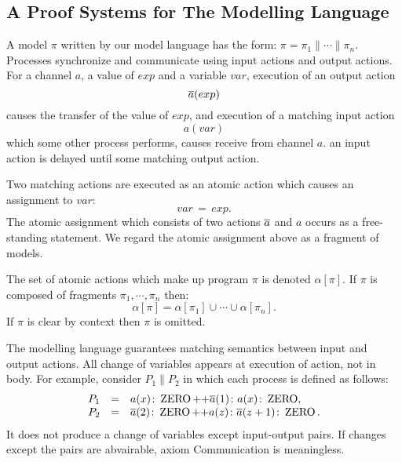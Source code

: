 \documentclass[12pt,a4paper,titlepage]{article}
\theoremstyle{break}
\begin{document}
\subsection{A Proof Systems for The Modelling Language}\label{sec:ProofSystems}
A model \(\pi\) written by our model language has the form: \(\pi=\pi_1\|\cdots\|\pi_n\).
Processes synchronize and communicate using input actions and output actions.
For a channel \(a\), a value of \(exp\) and a variable \(var\), execution of an output action
  \begin{displaymath}
\mbox{$\overline{a}$}(exp)
  \end{displaymath}
causes the transfer of the value of \(exp\), and execution of a matching input action 
  \begin{displaymath}
a(var)
  \end{displaymath}
which some other process performs, causes receive from channel \(a\).
an input action is delayed until some matching output action.

Two matching actions are executed as an atomic action which causes an assignment to \(var\):
  \begin{displaymath}
var\,=\,exp.
  \end{displaymath}
The atomic assignment which consists of two actions \(\mbox{$\overline{a}$}\) and \(a\) occurs as a free-standing statement.
We regard the atomic assignment above as a fragment of models.

The set of atomic actions which make up program \(\pi\) is denoted \(\alpha[\pi]\).
If \(\pi\) is composed of fragments \(\pi_1,\cdots,\pi_n\) then:
  \begin{displaymath}
\alpha[\pi]=\alpha[\pi_1]\cup\cdots\cup\alpha[\pi_n].
  \end{displaymath}
If \(\pi\) is clear by context then \(\pi\) is omitted.

The modelling language guarantees matching semantics between input and output actions.
All change of variables appears at execution of action, not in body.
For example, consider \(P_1\|P_2\) in which each process is defined as follows:
  \begin{displaymath}
    \begin{array}{lcl}
P_1&=&a(x)\colon\mathop{\mathrm{ZERO}}\nolimits\mbox{++}\mbox{$\overline{a}$}(1)\colon a(x)\colon\mathop{\mathrm{ZERO}}\nolimits,\\
P_2&=&\mbox{$\overline{a}$}(2)\colon\mathop{\mathrm{ZERO}}\nolimits\mbox{++}a(z)\colon\mbox{$\overline{a}$}(z+1)\colon\mathop{\mathrm{ZERO}}\nolimits.
    \end{array}
  \end{displaymath}
It does not produce a change of variables except input-output pairs.
If changes except the pairs are abvairable, axiom Communication is meaningless.
\end{document}

